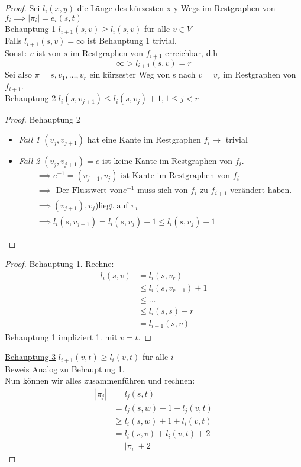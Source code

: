 \begin{proof}
Sei $l_i(x,y)$ die Länge des kürzesten x-y-Wegs im Restgraphen von $f_i \implies |\pi_i|=e_i(s,t)$ \\
\underline{Behauptung 1} $l_{i+1}(s,v) \ge l_i(s,v)$ für alle $v \in V$ \\
Falls $l_{i+1}(s,v)=\infty$ ist Behauptung 1 trivial. \\
Sonst: $v$ ist von $s$ im Restgraphen von $f_{i+1}$ erreichbar, d.h
\[
\infty>l_{i+1}(s,v)=r
\]
Sei also $\pi=s,v_1,\ldots,v_r$ ein kürzester Weg von s nach $v=v_r$ im Restgraphen von $f_{i+1}$. \\
\underline{Behauptung 2 } $l_i(s,v_{j+1}) \le l_i(s,v_j)+1, 1\le j<r$ \\
\begin{proof}
Behauptung 2
\begin{itemize}
	\item \emph{Fall 1} $(v_j,v_{j+1})$ hat eine Kante im Restgraphen $f_i \to$ trivial
	\item \emph{Fall 2} $(v_j,v_{j+1})=e$ ist keine Kante im Restgraphen von $f_i$.
		\begin{align*}
		&\implies e^{-1}=(v_{j+1},v_j) \text{ ist Kante im Restgraphen von } f_i \\
		&\implies \text{ Der Flusswert von} e^{-1} \text{ muss sich von } f_i \text{ zu } f_{i+1} \text{ verändert haben.} \\
		&\implies (v_{j+1}),v_j) \text{liegt auf }\pi_i \\
		&\implies l_i(s,v_{j+1}) =l_i(s,v_j) -1 \le l_i(s,v_j)+1
		\end{align*}
\end{itemize}
\end{proof}
\begin{proof}
Behauptung 1. Rechne:
\begin{align*}
	l_i(s,v) &= l_i(s,v_r) \\
		 &\le  l_i(s,v_{r-1}) +1 \\
		 &\le \ldots \\
		 &\le l_i(s,s) +r \\
		 &= l_{i+1}(s,v)
\end{align*}
Behauptung 1 impliziert 1. mit $v=t$. 
\end{proof}
\underline{Behauptung 3} $l_{i+1} (v,t) \ge l_i(v,t)$ für alle $i$ \\
Beweis Analog zu Behauptung 1. \\
Nun können wir alles zusammenführen und rechnen:
\begin{align*}
	|\pi_j| &= l_j(s,t) \\
		&= l_j(s,w) +1 +l_j(v,t) \\
		&\ge l_i(s,w) +1 + l_i(v,t) \\
		&= l_i(s,v) + l_i(v,t) +2 \\
		&= |\pi_i|+2
\end{align*}
\end{proof}

